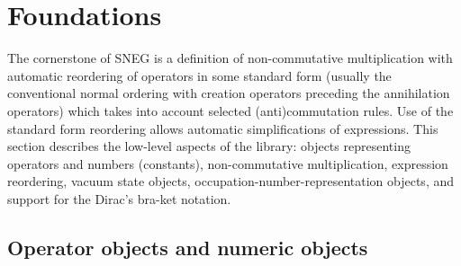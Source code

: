\documentclass[3p,number,preprint]{elsarticle}
\begin{document}

\section{Foundations}
\label{sec1}

The cornerstone of SNEG is a definition of non-commutative
multiplication with automatic reordering of operators in some standard
form (usually the conventional normal ordering with creation operators
preceding the annihilation operators) which takes into account
selected (anti)commutation rules. Use of the standard form reordering
allows automatic simplifications of expressions. This section
describes the low-level aspects of the library: objects representing
operators and numbers (constants), non-commutative multiplication,
expression reordering, vacuum state objects,
occupation-number-representation objects, and support for the Dirac's
bra-ket notation.


\subsection{Operator objects and numeric objects}
\end{document}
